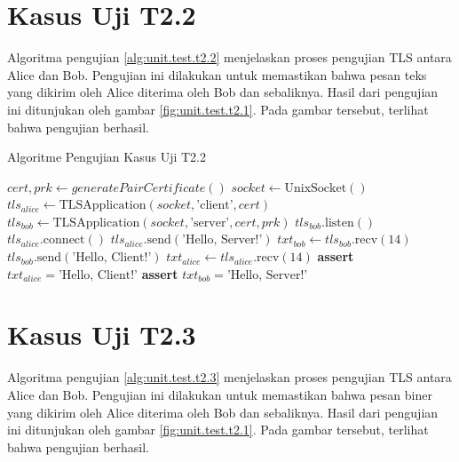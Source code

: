 \section{Kasus Uji T2.2}

Algoritma pengujian \ref{alg:unit.test.t2.2} menjelaskan proses pengujian TLS antara Alice dan Bob. Pengujian ini dilakukan untuk memastikan bahwa pesan teks yang dikirim oleh Alice diterima oleh Bob dan sebaliknya. Hasil dari pengujian ini ditunjukan oleh gambar \ref{fig:unit.test.t2.1}. Pada gambar tersebut, terlihat bahwa pengujian berhasil.

\begin{algorithm}
  \caption{Algoritme Pengujian Kasus Uji T2.2}
  \label{alg:unit.test.t2.2}
  \begin{algorithmic}
    \State $cert, prk \gets generatePairCertificate()$
    \State $socket \gets \text{UnixSocket}()$ 
    \State $tls_{alice} \gets \text{TLSApplication}(socket, \text{'client'}, cert)$ 
    \State $tls_{bob} \gets \text{TLSApplication}(socket, \text{'server'}, cert, prk)$
    \State
    \State $tls_{bob}.\text{listen}()$  
    \State $tls_{alice}.\text{connect}()$  
    \State
    \State $tls_{alice}.\text{send}(\text{'Hello, Server!'})$
    \State $txt_{bob} \gets tls_{bob}.\text{recv}(14)$
    \State
    \State $tls_{bob}.\text{send}(\text{'Hello, Client!'})$
    \State $txt_{alice} \gets tls_{alice}.\text{recv}(14)$
    \State
    \State \textbf{assert} $txt_{alice} = \text{'Hello, Client!'}$
    \State \textbf{assert} $txt_{bob} = \text{'Hello, Server!'}$
  \end{algorithmic}
\end{algorithm}

\section{Kasus Uji T2.3}

Algoritma pengujian \ref{alg:unit.test.t2.3} menjelaskan proses pengujian TLS antara Alice dan Bob. Pengujian ini dilakukan untuk memastikan bahwa pesan biner yang dikirim oleh Alice diterima oleh Bob dan sebaliknya. Hasil dari pengujian ini ditunjukan oleh gambar \ref{fig:unit.test.t2.1}. Pada gambar tersebut, terlihat bahwa pengujian berhasil.

